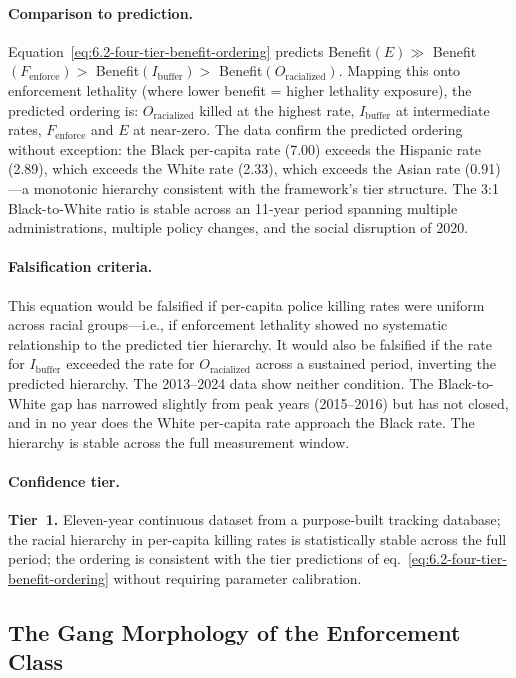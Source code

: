 \paragraph{Comparison to prediction.}
Equation~\ref{eq:6.2-four-tier-benefit-ordering} predicts Benefit$(E) \gg$ Benefit$(F_{\text{enforce}}) >$ Benefit$(I_{\text{buffer}}) >$ Benefit$(O_{\text{racialized}})$. Mapping this onto enforcement lethality (where lower benefit = higher lethality exposure), the predicted ordering is: $O_{\text{racialized}}$ killed at the highest rate, $I_{\text{buffer}}$ at intermediate rates, $F_{\text{enforce}}$ and $E$ at near-zero. The data confirm the predicted ordering without exception: the Black per-capita rate (7.00) exceeds the Hispanic rate (2.89), which exceeds the White rate (2.33), which exceeds the Asian rate (0.91)---a monotonic hierarchy consistent with the framework's tier structure. The 3:1 Black-to-White ratio is stable across an 11-year period spanning multiple administrations, multiple policy changes, and the social disruption of 2020.

\paragraph{Falsification criteria.}
This equation would be falsified if per-capita police killing rates were uniform across racial groups---i.e., if enforcement lethality showed no systematic relationship to the predicted tier hierarchy. It would also be falsified if the rate for $I_{\text{buffer}}$ exceeded the rate for $O_{\text{racialized}}$ across a sustained period, inverting the predicted hierarchy. The 2013--2024 data show neither condition. The Black-to-White gap has narrowed slightly from peak years (2015--2016) but has not closed, and in no year does the White per-capita rate approach the Black rate. The hierarchy is stable across the full measurement window.

\paragraph{Confidence tier.}
\textbf{Tier~1.} Eleven-year continuous dataset from a purpose-built tracking database; the racial hierarchy in per-capita killing rates is statistically stable across the full period; the ordering is consistent with the tier predictions of eq.~\ref{eq:6.2-four-tier-benefit-ordering} without requiring parameter calibration.

\subsection{The Gang Morphology of the Enforcement Class}

